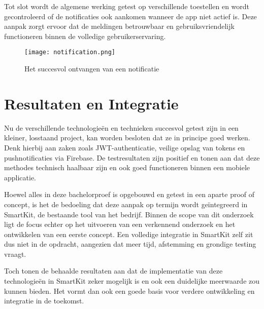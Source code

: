 Tot slot wordt de algemene werking getest op verschillende toestellen en wordt gecontroleerd of de notificaties ook aankomen wanneer de app niet actief is. Deze aanpak zorgt ervoor dat de meldingen betrouwbaar en gebruiksvriendelijk functioneren binnen de volledige gebruikerservaring. \\

\begin{figure}[H]
    \centering
    \texttt{[image: notification.png]}
    \caption{Het succesvol ontvangen van een notificatie}
    \label{fig:notification}
\end{figure}

\section{Resultaten en Integratie}

Nu de verschillende technologieën en technieken succesvol getest zijn in een kleiner, losstaand project, kan worden besloten dat ze in principe goed werken. Denk hierbij aan zaken zoals JWT-authenticatie, veilige opslag van tokens en pushnotificaties via Firebase. De testresultaten zijn positief en tonen aan dat deze methodes technisch haalbaar zijn en ook goed functioneren binnen een mobiele applicatie.

Hoewel alles in deze bachelorproef is opgebouwd en getest in een aparte proof of concept, is het de bedoeling dat deze aanpak op termijn wordt geïntegreerd in SmartKit, de bestaande tool van het bedrijf. Binnen de scope van dit onderzoek ligt de focus echter op het uitvoeren van een verkennend onderzoek en het ontwikkelen van een eerste concept. Een volledige integratie in SmartKit zelf zit dus niet in de opdracht, aangezien dat meer tijd, afstemming en grondige testing vraagt.

Toch tonen de behaalde resultaten aan dat de implementatie van deze technologieën in SmartKit zeker mogelijk is en ook een duidelijke meerwaarde zou kunnen bieden. Het vormt dan ook een goede basis voor verdere ontwikkeling en integratie in de toekomst.
